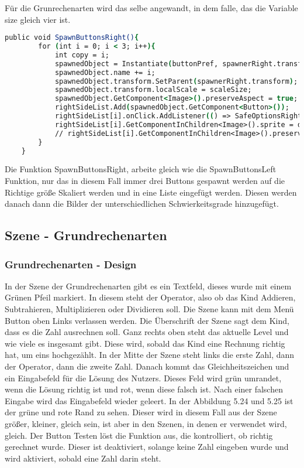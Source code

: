 Für die Grunrechenarten wird das selbe angewandt, in dem falle, das die Variable size gleich vier ist.
\begin{lstlisting}[language=csh, caption={MenuPickLevelAdvanced.cs SpawnButtonsRight Funktion}]
	public void SpawnButtonsRight(){
		for (int i = 0; i < 3; i++){
			int copy = i;
			spawnedObject = Instantiate(buttonPref, spawnerRight.transform.position, Quaternion.identity);
			spawnedObject.name += i;
			spawnedObject.transform.SetParent(spawnerRight.transform);
			spawnedObject.transform.localScale = scaleSize;
			spawnedObject.GetComponent<Image>().preserveAspect = true;
			rightSideList.Add(spawnedObject.GetComponent<Button>());
			rightSideList[i].onClick.AddListener(() => SafeOptionsRight(copy));
			rightSideList[i].GetComponentInChildren<Image>().sprite = difficulty[i];
			// rightSideList[i].GetComponentInChildren<Image>().preserveAspect = true;
		}
	}
\end{lstlisting}
Die Funktion SpawnButtonsRight, arbeite gleich wie die SpawnButtonsLeft Funktion, nur das in diesem Fall immer drei Buttons gespawnt werden auf die Richtige größe Skaliert werden und in eine Liste eingefügt werden. Diesen werden danach dann die Bilder der unterschiedlichen Schwierkeitsgrade hinzugefügt.
\subsection{Szene - Grundrechenarten}
\subsubsection{Grundrechenarten - Design}
In der Szene der Grundrechenarten gibt es ein Textfeld, dieses wurde mit einem Grünen Pfeil markiert. In diesem steht der Operator, also ob das Kind Addieren, Subtrahieren, Multiplizieren oder Dividieren soll. Die Szene kann mit dem Menü Button oben Links verlassen werden. Die Überschrift der Szene sagt dem Kind, dass es die Zahl ausrechnen soll. Ganz rechts oben steht das aktuelle Level und wie viele es insgesamt gibt. Diese wird, sobald das Kind eine Rechnung richtig hat, um eins hochgezählt. In der Mitte der Szene steht links die erste Zahl, dann der Operator, dann die zweite Zahl. Danach kommt das Gleichheitszeichen und ein Eingabefeld für die Lösung des Nutzers. Dieses Feld wird grün umrandet, wenn die Lösung richtig ist und rot, wenn diese falsch ist. Nach einer falschen Eingabe wird das Eingabefeld wieder geleert. In der Abbildung 5.24 und 5.25 ist der grüne und rote Rand zu sehen. Dieser wird in diesem Fall aus der Szene größer, kleiner, gleich sein, ist aber in den Szenen, in denen er verwendet wird, gleich. 
Der Button Testen löst die Funktion aus, die kontrolliert, ob richtig gerechnet wurde. Dieser ist deaktiviert, solange keine Zahl eingeben wurde und wird aktiviert, sobald eine Zahl darin steht.
